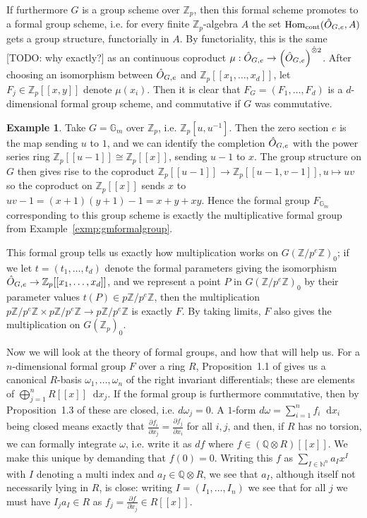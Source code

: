 \documentclass[12pt]{article}
\newcommand{\N}{\mathbb{N}}
\newcommand{\Z}{\mathbb{Z}}
\renewcommand{\G}{\mathbb{G}}
\newcommand{\Q}{\mathbb{Q}}
\newcommand*\diff{\mathop{}\!\mathrm{d}}
\newcommand{\tensor}{\otimes}
\DeclareMathOperator{\Hom}{Hom}
\theoremstyle{plain}
\theoremstyle{definition}
\newtheorem{exmp}[thm]{Example} %
\theoremstyle{remark}
\begin{document}
If furthermore $G$ is a group scheme over $\Z_p$, then this formal scheme promotes to a formal group scheme, i.e. for every finite $\Z_p$-algebra $A$ the set $\Hom_{\text{cont}}(\Hat{O}_{G,e},A)$ gets a group structure, functorially in $A$. By functoriality, this is the same [TODO: why exactly?] as an continuous coproduct $\mu: \Hat{O}_{G,e} \to \left(\Hat{O}_{G,e}\right)^{\Hat{\tensor} 2}$. After choosing an isomorphism between $\Hat{O}_{G,e}$ and $\Z_p[[x_1,\dots,x_d]]$, let $F_j \in \Z_p[[x,y]]$ denote $\mu(x_i)$. Then it is clear that $F_G = (F_1,\dots,F_d)$ is a $d$-dimensional formal group scheme, and commutative if $G$ was commutative.
\begin{exmp}
\label{exmp:gmtoformal} %
Take $G = \G_m$ over $\Z_p$, i.e. $\Z_p[u,u^{-1}]$. Then the zero section $e$ is the map sending $u$ to $1$, and we can identify the completion $\Hat{O}_{G,e}$ with the power series ring $\Z_p[[u-1]] \cong \Z_p[[x]]$, sending $u-1$ to $x$. The group structure on $G$ then gives rise to the coproduct $\Z_p[[u-1]] \to \Z_p[[u-1,v-1]], u \mapsto uv$ so the coproduct on $\Z_p[[x]]$ sends $x$ to $uv-1 = (x+1)(y+1) -1 = x + y + xy$. Hence the formal group $F_{\G_m}$ corresponding to this group scheme is exactly the multiplicative formal group from Example~\ref{exmp:gmformalgroup}.
\end{exmp}

This formal group tells us exactly how multiplication works on $G(\Z/p^e\Z)_0$; if we let $t = (t_1,\dots,t_d)$ denote the formal parameters giving the isomorphism $\Hat{O}_{G,e} \to \Z_p[[x_1,\dots,x_d]]$, and we represent a point $P$ in $G(\Z/p^e\Z)_0$ by their parameter values $t(P) \in p\Z/p^e\Z$, then the multiplication $p\Z/p^e\Z \times p\Z/p^e\Z \to p\Z/p^e\Z$ is exactly $F$. By taking limits, $F$ also gives the multiplication on $G(\Z_p)_0$.

Now we will look at the theory of formal groups, and how that will help us. For a $n$-dimensional formal group $F$ over a ring $R$, Proposition~1.1 of \citep{honda70} gives us a canonical $R$-basis $\omega_1,\dots,\omega_n$ of the right invariant differentials; these are elements of $\bigoplus_{j=1}^n R[[x]] \diff x_j$. If the formal group is furthermore commutative, then by Proposition~1.3 of \citep{honda70} these are closed, i.e. $d\omega_j = 0$. A $1$-form $d\omega = \sum_{i=1}^n f_i \diff x_i$ being closed means exactly that $\frac{\partial f_i}{\partial x_j} = \frac{\partial f_j}{\partial x_i}$ for all $i,j$, and then, if $R$ has no torsion, we can formally integrate $\omega$, i.e. write it as $df$ where $f \in (\Q\tensor R)[[x]]$. We make this unique by demanding that $f(0) = 0$. Writing this $f$ as $\sum_{I \in \N^n} a_I x^I$ with $I$ denoting a multi index and $a_I \in \Q\tensor R$, we see that $a_I$, although itself not necessarily lying in $R$, is close: writing $I = (I_1,\dots,I_n)$ we see that for all $j$ we must have $I_j a_I \in R$ as $f_j = \frac{\partial f}{\partial x_j} \in R[[x]]$.
\end{document}

